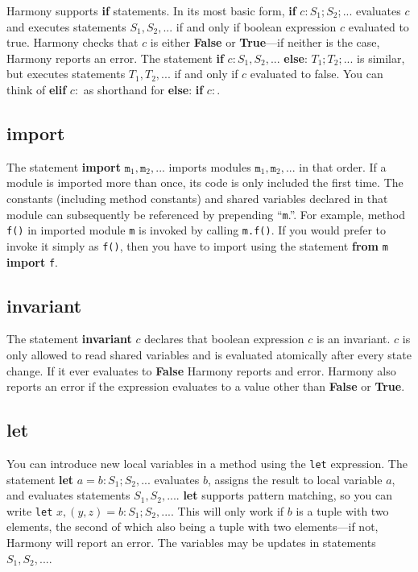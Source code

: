 \documentclass{report}
\begin{document}
Harmony supports \textbf{if} statements.
In its most basic form, \textbf{if} $c: S_1; S_2; ...$ evaluates $c$
and executes statements $S_1, S_2, ...$ if and only if boolean expression
$c$ evaluated to true.
Harmony checks that $c$ is either \textbf{False} or \textbf{True}---if neither
is the case, Harmony reports an error.
The statement \textbf{if} $c: S_1, S_2, ...$ \textbf{else}:
$T_1; T_2; ...$ is similar, but executes statements $T_1, T_2, ...$
if and only if $c$ evaluated to false.
You can think of \textbf{elif} $c:$ as shorthand for
\textbf{else}: \textbf{if} $c:$.

\subsection*{\textbf{import}}

The statement \textbf{import} $\mathtt{m}_1, \mathtt{m}_2, ...$ imports modules
$\mathtt{m}_1, \mathtt{m}_2, ...$ in that order.
If a module is imported more than once,
its code is only included the first time.
The constants (including method constants) and shared variables declared 
in that module can subsequently be referenced by prepending ``\texttt{m}.''.
For example, method \texttt{f()} in imported module \texttt{m} is invoked
by calling \texttt{m.f()}.  If you would prefer to invoke it simply as
\texttt{f()}, then you have to import using the statement
\textbf{from} \texttt{m} \textbf{import} \texttt{f}.

\subsection*{\textbf{invariant}}

The statement \textbf{invariant} $c$ declares that boolean expression $c$
is an invariant.  $c$ is only allowed to read shared variables and
is evaluated atomically after every state change.
If it ever evaluates to \textbf{False} Harmony reports and error.  Harmony
also reports an error if the expression evaluates to a value other
than \textbf{False} or \textbf{True}.

\subsection*{\textbf{let}}

You can introduce new local variables in a method using the
\texttt{let} expression.
The statement \textbf{let} $a = b: S_1; S_2, ...$ evaluates $b$, assigns
the result to local variable $a$, and evaluates statements
$S_1, S_2, ...$.  \textbf{let} supports pattern matching, so you can
write \texttt{let} $x, (y, z) = b: S_1; S_2, ...$.  This will only work
if $b$ is a tuple with two elements, the second of which also being a
tuple with two elements---if not, Harmony will report an error.
The variables may be updates in statements $S_1, S_2, ...$.
\end{document}
